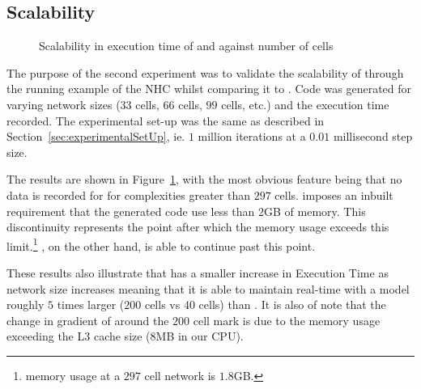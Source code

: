 \subsection{Scalability}

\begin{figure}[htbp]
	\centering
	
	\caption{Scalability in  execution time of \simulink and \ourTool against number of cells}
	\label{fig:scalability}
\end{figure}

The purpose of the second experiment was to validate the scalability of \ourTool through the running example of the \ac{NHC} whilst comparing it to \simulink.
Code was generated for varying network sizes ($33$ cells, $66$ cells, $99$ cells, etc.) and the execution time recorded.
The experimental set-up was the same as described in Section~\ref{sec:experimentalSetUp}, ie. $1$ million iterations at a $0.01$ millisecond step size.

The results are shown in Figure~\ref{fig:scalability}, with the most obvious feature being that no data is recorded for \simulink for complexities greater than $297$ cells.
\simulink imposes an inbuilt requirement that the generated code use less than $2$GB of memory. This discontinuity represents the point after which the memory usage exceeds this limit.\footnote{\simulink memory usage at a $297$ cell network is $1.8$GB.}
\ourTool, on the other hand, is able to continue past this point.

These results also illustrate that \ourTool has a smaller increase in Execution Time as network size increases meaning that it is able to maintain real-time with a model roughly $5$ times larger ($200$ cells vs $40$ cells) than \simulink.
It is also of note that the change in gradient of \ourTool around the $200$ cell mark is due to the memory usage exceeding the L$3$ cache size ($8$MB in our CPU).
